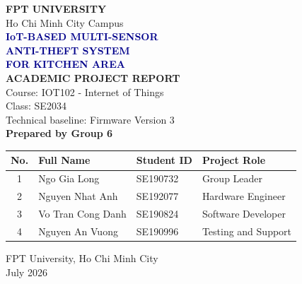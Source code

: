 \documentclass[11pt,a4paper]{report}
\begin{document}

\begin{titlepage}
\begin{center}
  \vspace*{0.5cm}
  {\Large\bfseries\textcolor{fptorange}{FPT UNIVERSITY}}\\[0.2cm]
  {\large Ho Chi Minh City Campus}\\[1.8cm]

  {\Huge\bfseries\textcolor{darkblue}{IoT-BASED MULTI-SENSOR}}\\[0.25cm]
  {\Huge\bfseries\textcolor{darkblue}{ANTI-THEFT SYSTEM}}\\[0.25cm]
  {\Huge\bfseries\textcolor{darkblue}{FOR KITCHEN AREA}}\\[1.5cm]

  {\Large\bfseries\textcolor{fptorange}{ACADEMIC PROJECT REPORT}}\\[0.3cm]
  {\large Course: IOT102 - Internet of Things}\\
  {\large Class: SE2034}\\
  {\large Technical baseline: Firmware Version 3}\\[1.6cm]

  \textbf{\large Prepared by Group 6}\\[0.4cm]
  \begin{tabular}{clll}
    \toprule
    \textbf{No.} & \textbf{Full Name} & \textbf{Student ID} & \textbf{Project Role}\\
    \midrule
    1 & Ngo Gia Long & SE190732 & Group Leader\\
    2 & Nguyen Nhat Anh & SE192077 & Hardware Engineer\\
    3 & Vo Tran Cong Danh & SE190824 & Software Developer\\
    4 & Nguyen An Vuong & SE190996 & Testing and Support\\
    \bottomrule
  \end{tabular}

  \vfill
  {\large FPT University, Ho Chi Minh City}\\
  {\large July 2026}
\end{center}
\end{titlepage}

\end{document}
